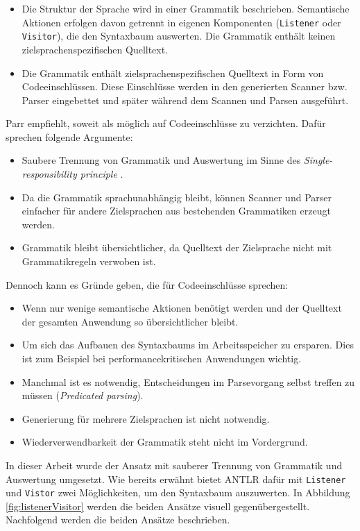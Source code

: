 \begin{itemize}
    \item Die Struktur der Sprache wird in einer Grammatik beschrieben. Semantische Aktionen erfolgen davon getrennt in eigenen Komponenten (\lstinline{Listener} oder \lstinline{Visitor}), die den Syntaxbaum auswerten. Die Grammatik enthält keinen zielsprachenspezifischen Quelltext.
    \item Die Grammatik enthält zielsprachenspezifischen Quelltext in Form von Codeeinschlüssen. Diese Einschlüsse werden in den generierten Scanner bzw. Parser eingebettet und später während dem Scannen und Parsen ausgeführt. 
\end{itemize}

Parr empfiehlt, soweit als möglich auf Codeeinschlüsse zu verzichten. Dafür sprechen folgende Argumente:
\begin{itemize}
    \item Saubere Trennung von Grammatik und Auswertung im Sinne des \emph{Single-res\-pon\-si\-bi\-li\-ty principle} \cite{AgileSoftwareDevelopmentPPP}.
    \item Da die Grammatik sprachunabhängig bleibt, können Scanner und Parser einfacher für andere Zielsprachen aus bestehenden Grammatiken erzeugt werden.
    \item Grammatik bleibt übersichtlicher, da Quelltext der Zielsprache nicht mit Grammatikregeln verwoben ist.
\end{itemize}

Dennoch kann es Gründe geben, die für Codeeinschlüsse sprechen:
\begin{itemize}
    \item Wenn nur wenige semantische Aktionen benötigt werden und der Quelltext der gesamten Anwendung so übersichtlicher bleibt.
    \item Um sich das Aufbauen des Syntaxbaums im Arbeitsspeicher zu ersparen. Dies ist zum Beispiel bei performancekritischen Anwendungen wichtig.
    \item Manchmal ist es notwendig, Entscheidungen im Parsevorgang selbst treffen zu müssen (\emph{Predicated parsing}).
    \item Generierung für mehrere Zielsprachen ist nicht notwendig.
    \item Wiederverwendbarkeit der Grammatik steht nicht im Vordergrund.
\end{itemize}

In dieser Arbeit wurde der Ansatz mit sauberer Trennung von Grammatik und Auswertung umgesetzt. Wie bereits erwähnt bietet ANTLR dafür mit \lstinline{Listener} und \lstinline{Vistor} zwei Möglichkeiten, um den Syntaxbaum auszuwerten. In Abbildung \ref{fig:listenerVisitor} werden die beiden Ansätze visuell gegenübergestellt. Nachfolgend werden die beiden Ansätze beschrieben.


